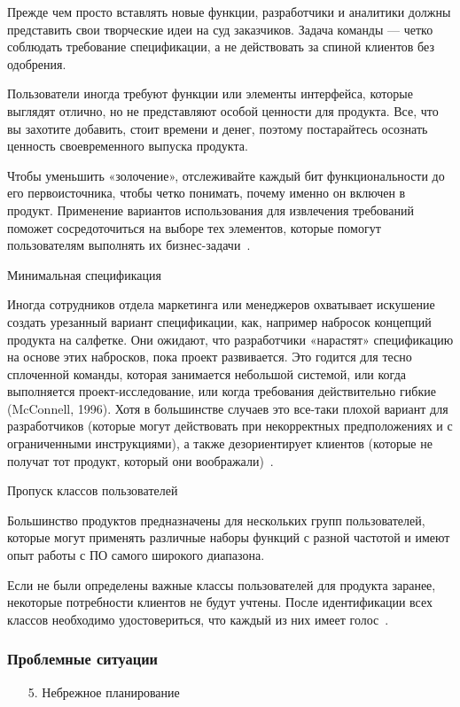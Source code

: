 \documentclass{../industrial-development}
\begin{document}
{Прежде чем просто вставлять новые функции, разработчики и аналитики должны представить свои творческие идеи на суд заказчиков. Задача команды — четко соблюдать требование спецификации, а не действовать за спиной клиентов без одобрения.

Пользователи иногда требуют функции или элементы интерфейса, которые выглядят отлично, но не представляют особой ценности для продукта. Все, что вы захотите добавить, стоит времени и денег, поэтому постарайтесь осознать ценность своевременного выпуска продукта. 

Чтобы уменьшить «золочение», отслеживайте каждый бит функциональности до его первоисточника, чтобы четко понимать, почему именно он включен в продукт. Применение вариантов использования для извлечения требований поможет сосредоточиться на выборе тех элементов, которые помогут пользователям выполнять их бизнес-задачи~\cite[с.~18-19]{Wiegers}.

\alert{Минимальная спецификация}

Иногда сотрудников отдела маркетинга или менеджеров охватывает искушение создать урезанный вариант спецификации, как, например набросок концепций продукта на салфетке. Они ожидают, что разработчики «нарастят» спецификацию на основе этих набросков, пока проект развивается. Это годится для тесно сплоченной команды, которая занимается небольшой системой, или когда выполняется проект-исследование, или когда требования действительно гибкие (McConnell, 1996). Хотя в большинстве случаев это все-таки плохой вариант для разработчиков (которые могут действовать при некорректных предположениях и с ограниченными инструкциями), а также дезориентирует клиентов (которые не получат тот продукт, который они воображали)~\cite[с.~19]{Wiegers}.

\alert{Пропуск классов пользователей}

Большинство продуктов предназначены для нескольких групп пользователей, которые могут применять различные наборы функций с разной частотой и имеют опыт работы с ПО самого широкого диапазона.

Если не были определены важные классы пользователей для продукта заранее, некоторые потребности клиентов не будут учтены.
После идентификации всех классов необходимо удостовериться, что каждый из них имеет голос~\cite[с.~19]{Wiegers}.


\begin{frame} \frametitle {Проблемные ситуации}
\begin{itemize}

\item[5.] Небрежное планирование


\end{itemize}
\end{frame}}
\end{document}

